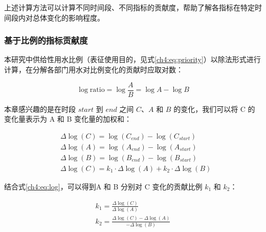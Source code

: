 上述计算方法可以计算不同时间段、不同指标的贡献度，帮助了解各指标在特定时间段内对总体变化的影响程度。

\subsubsection{基于比例的指标贡献度}

本研究中供给性用水比例（表征使用目的，见式\ref{ch4:eq:priority}）以除法形式进行计算，在分解各部门用水对比例变化的贡献时应取对数：

\begin{equation}
    \log{\text{ratio}}=\log{\frac{A}{B}} = \log{A} - \log{B}
    \label{ch4:eq:log}
\end{equation}

本章感兴趣的是在时段 $start$ 到 $end$ 之间 $C$、$A$ 和 $B$ 的变化，我们可以将 C 的变化量表示为 A 和 B 变化量的加权和：

\begin{equation}
    \begin{aligned}
    & \Delta \log (C)=\log \left(C_{end}\right)-\log \left(C_{start}\right) \\
    & \Delta \log (A)=\log \left(A_{end}\right)-\log \left(A_{start}\right) \\
    & \Delta \log (B)=\log \left(B_{end}\right)-\log \left(B_{start}\right) \\
    & \Delta \log (C)=k_1 \cdot \Delta \log (A)+k_2 \cdot \Delta \log (B)
    \end{aligned}
\end{equation}

结合式\ref{ch4:eq:log}，可以得到A 和 B 分别对 C 变化的贡献比例 $k_1$ 和 $k_2$：

\begin{equation}
    \begin{gathered}
    k_1=\frac{\Delta \log (C)}{\Delta \log (A)} \\
    k_2=\frac{\Delta \log (C)-\Delta \log (A)}{-\Delta \log (B)}
    \end{gathered}
\end{equation}
